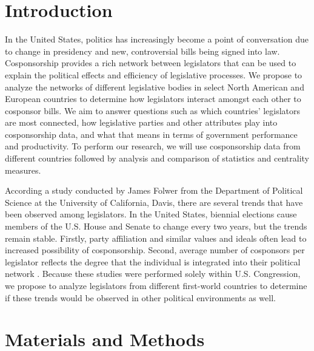 \documentclass[12pt]{article}
\begin{document}
\begin{multicols*}{2}
\section{Introduction} 

In the United States, politics has increasingly become a point of conversation due to change in presidency and new, controversial bills being signed into law. Cosponsorship provides a rich network between legislators that can be used to explain the political effects and efficiency of legislative processes. We propose to analyze the networks of different legislative bodies in select North American and European countries to determine how legislators interact amongst each other to cosponsor bills. We aim to answer questions such as which countries' legislators are most connected, how legislative parties and other attributes play into cosponsorship data, and what that means in terms of government performance and productivity. To perform our research, we will use cosponsorship data from different countries followed by analysis and comparison of statistics and centrality measures.

According a study conducted by James Folwer from the Department of Political Science at the University of California, Davis, there are several trends that have been observed among legislators. In the United States, biennial elections cause members of the U.S. House and Senate to change every two years, but the trends remain stable. Firstly, party affiliation and similar values and ideals often lead to increased possibility of cosponsorship. Second, average number of cosponsors per legislator reflects the degree that the individual is integrated into their political network \cite{fowler1}. Because these studies were performed solely within U.S. Congression, we propose to analyze legislators from different first-world countries to determine if these trends would be observed in other political environments as well.
 
\section{Materials and Methods}


\end{multicols*}
\end{document}
